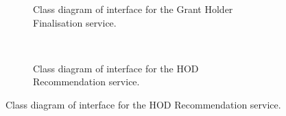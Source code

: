 \documentclass[12pt]{article}
\begin{document}
\begin{figure}[H]
\begin{subfigure}[p]{0.47\textwidth}
\centering	
{}
\caption{Class diagram of interface for the Grant Holder Finalisation service.}
\end{subfigure}
~
\begin{subfigure}[p]{0.47\textwidth}
\centering	
{}
\caption{Class diagram of interface for the HOD Recommendation service.}
\end{subfigure}


\end{figure}
\end{document}
